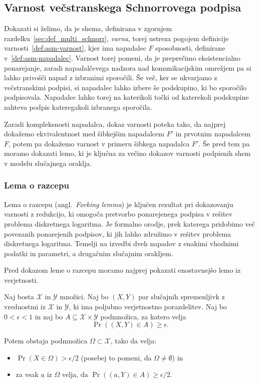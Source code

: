 \subsection{Varnost večstranskega Schnorrovega podpisa}
\label{sec:proof_multi_schnorr}
Dokazati si želimo, da je shema, definirana v zgornjem razdelku~\ref{sec:def_multi_schnorr}, \textit{varna},
torej ustreza pogojem definicije varnosti~\ref{def:asm-varnost}, kjer ima napadalec $F$ sposobnosti,
definirane v~\ref{def:asm-napadalec}. Varnost torej pomeni, da je preprečimo eksistencialno ponarejanje,
zaradi napadalčevega nadzora nad komunikacijskim omrežjem pa si lahko privošči napad z izbranimi sporočili.
Še več, ker se ukvarjamo z večstranskimi podpisi, si napadalec lahko izbere še podskupino, ki bo 
sporočilo podpisovala. Napadalec lahko torej na katerikoli točki od katerekoli podskupine zahteva
podpis kateregakoli izbranega sporočila.

Zaradi kompleksnosti napadalca, dokaz varnosti poteka tako, da najprej dokažemo ekvivalentnost med
šibkejšim napadalcem $F'$ in prvotnim napadalcem $F$, potem pa dokažemo varnost v primeru šibkega
napadalca $F'$. Še pred tem pa moramo dokazati lemo, ki je ključna za večino dokazov varnosti podpisnih
shem v modelu slučajnega oraklja.

\subsubsection{Lema o razcepu}
Lema o razcepu (angl.\ \textit{Forking lemma}) je ključen rezultat pri dokazovanju varnosti z redukcijo,
ki omogoča pretvorbo ponarejenega podpisa v rešitev problema diskretnega logaritma. Je formalno orodje,
prek katerega pridobimo več povezanih ponarejenih podpisov, ki jih lahko združimo v rešitev problema
diskretnega logaritma. Temelji na izvedbi dveh napadov z enakimi vhodnimi podatki in parametri, a
drugačnim slučajnim orakljem.

Pred dokazom leme o razcepu moramo najprej pokazati enostavnejšo lemo iz verjetnosti.

\begin{lema}
\label{lema:verjetnost}
    Naj bosta $\mathcal{X}$ in $\mathcal{Y}$ množici. Naj bo $(X, Y)$ par slučajnih spremenljivk z
    vrednostmi iz $\mathcal{X}$ in $\mathcal{Y}$, ki ima poljubno verjetnostno porazdelitev. Naj bo
    $0 < \epsilon < 1$ in naj bo $A \subseteq \mathcal{X} \times \mathcal{Y}$ podmnožica, za katero
    velja
    $$
    \Pr((X, Y) \in A) \geq \epsilon.
    $$

    Potem obstaja podmnožica $\Omega \subset \mathcal{X}$, tako da velja:
    \begin{itemize}
        \item $\Pr(X \in \Omega) > \epsilon / 2$ (posebej to pomeni, da $\Omega \neq \emptyset$) in
        \item za vsak $a$ iz $\Omega$ velja, da $\Pr((a, Y) \in A) \geq \epsilon / 2$.
    \end{itemize}
\end{lema}

